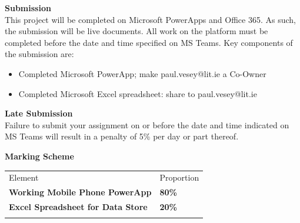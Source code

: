 \newpage


\textbf{Submission}\\
This project will be completed on Microsoft PowerApps and Office 365. As such, the submission will be live documents.  All work on the platform must be completed before the date and time specified on MS Teams.  Key components of the submission are:
\begin{itemize}
	\item Completed Microsoft PowerApp; make paul.vesey@lit.ie a Co-Owner
	\item Completed Microsoft Excel spreadsheet: share to paul.vesey@lit.ie
\end{itemize}

\vspace{0.5cm}
\textbf{Late Submission}\\
Failure to submit your assignment on or before the date and time indicated on MS Teams will result in a penalty of 5\% per day or part thereof.

\vspace{0.5cm}
\textbf{Marking Scheme}

\begin{table}[h!]
     \begin{center}
     \begin{tabular}{p{8cm}  p{2cm} }
     \toprule
      \textbf\large{Element} & \textbf\large{Proportion} \\ 
    \cmidrule(r){1-1}\cmidrule(lr){2-2}
      \textbf{Working Mobile Phone PowerApp} & \textbf{80\%}\\
      \textbf{Excel Spreadsheet for Data Store} & \textbf{20\%}\\
      \\ \bottomrule
      \end{tabular}
      \label{tbl:markSchemeAsmt3}
      \end{center}
 \end{table}


